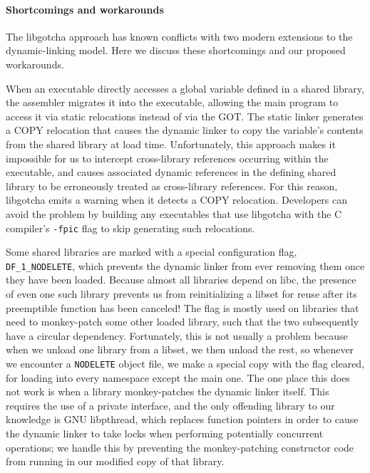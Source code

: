 \paragraph{Shortcomings and workarounds}

The libgotcha approach has known conflicts with two modern extensions to the
dynamic-linking model.  Here we discuss these shortcomings and our proposed
workarounds.

When an executable directly accesses a global variable defined in a shared library,
the assembler migrates it into the executable, allowing the main program to access it
via static relocations instead of via the GOT.  The static linker generates a COPY
relocation that causes the dynamic linker to copy the variable's contents from the
shared library at load time.  Unfortunately, this approach makes
it impossible for us to intercept cross-library references occurring within the
executable, and causes associated dynamic references in the defining shared library
to be erroneously treated as cross-library references.  For this reason, libgotcha
emits a warning when it detects a COPY relocation.  Developers can avoid the problem
by building any executables that use libgotcha with the C compiler's \texttt{-fpic}
flag to skip generating such relocations.

Some shared libraries are marked with a special configuration flag,
\texttt{DF\_1\_NODELETE}, which prevents the dynamic linker from ever removing them
once they have been loaded.  Because almost all libraries depend on libc, the
presence of even one such library prevents us from reinitializing a libset for reuse
after its preemptible function has been canceled!  The flag is mostly used on
libraries that need
to monkey-patch some other loaded library, such that the two subsequently have a
circular dependency.  Fortunately, this is not usually a problem because when we
unload one library from a libset, we then unload the rest, so whenever we encounter a
\texttt{NODELETE} object file, we make a special copy with the flag cleared, for
loading into every namespace except the main one.  The one place this does not work
is when a library monkey-patches the dynamic linker itself.  This
requires the use of a private interface, and the only offending library to our
knowledge is GNU libpthread, which replaces function pointers in order to cause the
dynamic linker to take locks when performing potentially concurrent operations; we
handle this by preventing the monkey-patching constructor code from running in our
modified copy of that library.

